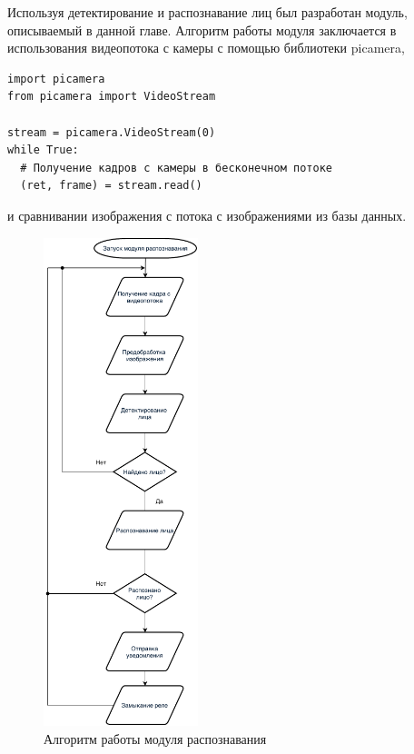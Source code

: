 Используя детектирование и распознавание лиц был разработан модуль,
описываемый в данной главе. Алгоритм работы модуля заключается в использования
видеопотока с камеры с помощью библиотеки picamera,

\begin{lstlisting}
import picamera 
from picamera import VideoStream

stream = picamera.VideoStream(0)
while True:
  # Получение кадров с камеры в бесконечном потоке
  (ret, frame) = stream.read()
\end{lstlisting}
и сравнивании изображения с потока с изображениями из базы данных. 

\begin{figure}[h!]
  \centering
  \setlength{\fboxsep}{5pt}
  \includegraphics[width=0.4\textwidth]{data-visualisation/image-processing}
  \vspace*{6pt}
  \caption{Алгоритм работы модуля распознавания}\label{fig:image-processing}
\end{figure}


